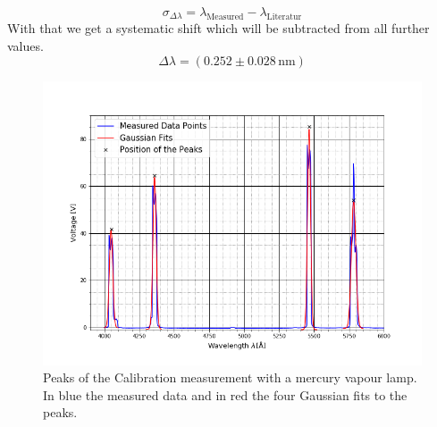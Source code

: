 \begin{equation}
	\sigma_{\Delta \lambda}=\lambda_{\text{Measured}} - \lambda_{\text{Literatur}}
\end{equation}
With that we get a systematic shift which will be subtracted from all further values. $$\Delta \lambda=(0.252\pm 0.028\,\text{nm})$$
\begin{figure}[ht]
	\includegraphics[scale=0.5]{Bild/QS.png}
	\centering
	\caption[Calibration with Mercury Vapour Lamp]{Peaks of the Calibration measurement with a mercury vapour lamp. In blue the measured data and in red the four Gaussian fits to the peaks.}
	\label{figEichung}
\end{figure}
